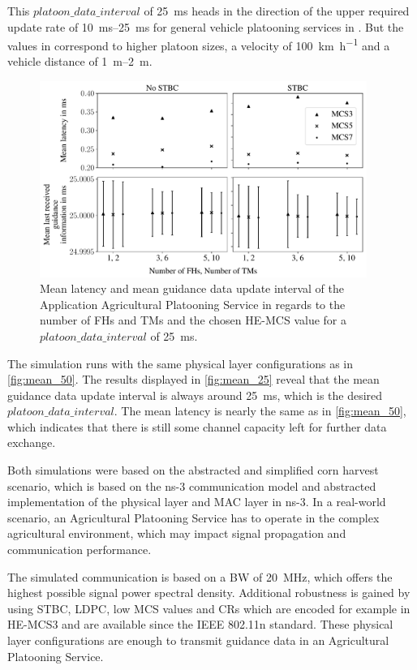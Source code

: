 This $platoon\_data\_interval$ of \SI{25}{\milli\second} heads in the direction of the upper required update rate of \SIrange{10}{25}{\milli\second} for general
vehicle platooning services in \cite{TR-22.886}.
But the values in \cite{TR-22.886} correspond to higher platoon sizes, a velocity of \SI{100}{\kilo\meter\per\hour} and a
vehicle distance of \SIrange{1}{2}{\metre}.


\begin{figure}[]%
   \centering
   \includegraphics[width=0.95\textwidth]{figures/latency_lastUpdate25ms}
   \caption{Mean latency and mean guidance data update interval of the Application Agricultural Platooning Service in regards to the number of \ac{FH}s and \ac{TM}s and
   the chosen \ac{HE}-\ac{MCS} value for a $platoon\_data\_interval$ of \SI{25}{\milli\second}.}
   \label{fig:mean_25}%
\end{figure}

The simulation runs with the same physical layer configurations as in \autoref{fig:mean_50}.
The results displayed in \autoref{fig:mean_25} reveal that the mean guidance data update interval is always around \SI{25}{\milli\second},
which is the desired $platoon\_data\_interval$.
The mean latency is nearly the same as in \autoref{fig:mean_50}, which indicates that there is still some channel capacity left for
further data exchange.

Both simulations were based on the abstracted and simplified corn harvest scenario, which is based on the ns-3 communication model and
abstracted implementation of the physical layer and MAC layer in ns-3.
In a real-world scenario, an Agricultural Platooning Service has to operate in the complex agricultural environment, which
may impact signal propagation and communication performance.

The simulated communication is based on a \ac{BW} of \SI{20}{\mega\hertz}, which offers the highest possible signal power spectral density.
Additional robustness is gained by using \ac{STBC}, \ac{LDPC}, low \ac{MCS} values and \ac{CR}s which are encoded for example in
\ac{HE}-\ac{MCS}3 and are available since the IEEE 802.11n standard.
These physical layer configurations are enough to transmit guidance data in an Agricultural Platooning Service.

